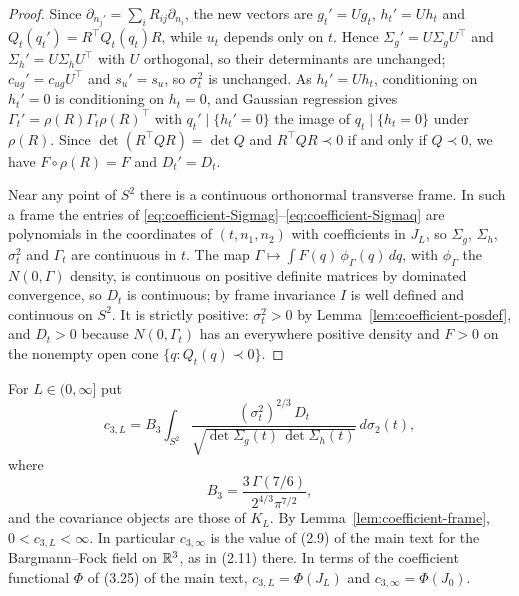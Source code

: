\begin{proof}
Since $\partial_{n_j'}=\sum_iR_{ij}\partial_{n_i}$, the new vectors are $g_t'=Ug_t$, $h_t'=Uh_t$ and $Q_t(q_t')=R^{\top}Q_t(q_t)R$, while $u_t$ depends only on $t$. Hence $\Sigma_g'=U\Sigma_gU^{\top}$ and $\Sigma_h'=U\Sigma_hU^{\top}$ with $U$ orthogonal, so their determinants are unchanged; $c_{ug}'=c_{ug}U^{\top}$ and $s_u'=s_u$, so $\sigma_t^2$ is unchanged. As $h_t'=Uh_t$, conditioning on $h_t'=0$ is conditioning on $h_t=0$, and Gaussian regression gives $\Gamma_t'=\rho(R)\Gamma_t\rho(R)^{\top}$ with $q_t'\mid\{h_t'=0\}$ the image of $q_t\mid\{h_t=0\}$ under $\rho(R)$. Since $\det(R^{\top}QR)=\det Q$ and $R^{\top}QR\prec0$ if and only if $Q\prec0$, we have $F\circ\rho(R)=F$ and $D_t'=D_t$.

Near any point of $S^2$ there is a continuous orthonormal transverse frame. In such a frame the entries of \eqref{eq:coefficient-Sigmag}--\eqref{eq:coefficient-Sigmaq} are polynomials in the coordinates of $(t,n_1,n_2)$ with coefficients in $J_L$, so $\Sigma_g$, $\Sigma_h$, $\sigma_t^2$ and $\Gamma_t$ are continuous in $t$. The map $\Gamma\mapsto\int F(q)\,\phi_\Gamma(q)\,dq$, with $\phi_\Gamma$ the $N(0,\Gamma)$ density, is continuous on positive definite matrices by dominated convergence, so $D_t$ is continuous; by frame invariance $I$ is well defined and continuous on $S^2$. It is strictly positive: $\sigma_t^2>0$ by Lemma~\ref{lem:coefficient-posdef}, and $D_t>0$ because $N(0,\Gamma_t)$ has an everywhere positive density and $F>0$ on the nonempty open cone $\{q:Q_t(q)\prec0\}$.
\end{proof}

\begin{definition}\label{def:coefficient-cL}
For $L\in(0,\infty]$ put
\begin{equation}\label{eq:coefficient-cL}
c_{3,L}=B_3\int_{S^2}\frac{(\sigma_t^2)^{2/3}\,D_t}{\sqrt{\det\Sigma_g(t)\,\det\Sigma_h(t)}}\,d\sigma_2(t),
\end{equation}
where
\begin{equation}\label{eq:coefficient-B3}
B_3=\frac{3\,\Gamma(7/6)}{2^{4/3}\pi^{7/2}},
\end{equation}
and the covariance objects are those of $K_L$. By Lemma~\ref{lem:coefficient-frame}, $0<c_{3,L}<\infty$. In particular $c_{3,\infty}$ is the value of (2.9) of the main text for the Bargmann--Fock field on $\mathbb R^3$, as in (2.11) there. In terms of the coefficient functional $\Phi$ of (3.25) of the main text, $c_{3,L}=\Phi(J_L)$ and $c_{3,\infty}=\Phi(J_0)$.
\end{definition}

